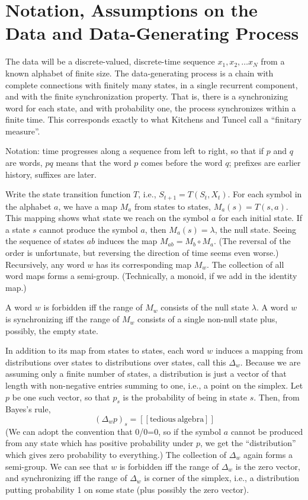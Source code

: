 \documentclass[../new-procedure.tex]{subfiles}
\begin{document}
\section{Notation, Assumptions on the Data and Data-Generating Process}

The data will be a discrete-valued, discrete-time sequence $x_1, x_2, \ldots
x_N$ from a known alphabet of finite size.  The data-generating process is a
chain with complete connections
\cite{Fernandez-Maillard-chains-with-complete-connections,Iosifescu-Grigorescu-complete-connections,Iosifescu-Theodorescu-random-processes}
with finitely many states, in a single recurrent component, and with the finite
synchronization property.  That is, there is a synchronizing word for each
state, and with probability one, the process synchronizes within a finite time.
This corresponds exactly to what Kitchens and Tuncel \cite{Kitchens-Tuncel}
call a ``finitary measure''.

Notation: time progresses along a sequence from left to right, so that if $p$
and $q$ are words, $pq$ means that the word $p$ comes before the word $q$;
prefixes are earlier history, suffixes are later.

Write the state transition function $T$, i.e., $S_{t+1} = T(S_t, X_t)$.  For
each symbol in the alphabet $a$, we have a map $M_a$ from states to states,
$M_a(s) = T(s,a)$.  This mapping shows what state we reach on the symbol $a$
for each initial state.  If a state $s$ cannot produce the symbol $a$, then
$M_a(s) = \lambda$, the null state.  Seeing the sequence of states $ab$ induces
the map $M_{ab} = M_b \circ M_a$.  (The reversal of the order is unfortunate,
but reversing the direction of time seems even worse.)  Recursively, any word
$w$ has its corresponding map $M_w$.  The collection of all word maps forms a
semi-group.  (Technically, a monoid, if we add in the identity map.)

A word $w$ is forbidden iff the range of $M_w$ consists of the null state
$\lambda$.  A word $w$ is synchronizing iff the range of $M_w$ consists of a
single non-null state plus, possibly, the empty state.

In addition to its map from states to states, each word $w$ induces a mapping
from distributions over states to distributions over states, call this
$\Delta_w$. Because we are assuming only a finite number of states, a
distribution is just a vector of that length with non-negative entries summing
to one, i.e., a point on the simplex.  Let $p$ be one such vector, so that
$p_s$ is the probability of being in state $s$.  Then, from Bayes's
rule,
\[
(\Delta_w p)_s = [[\mathrm{tedious\ algebra}]]
\]
(We can adopt the convention that 0/0=0, so if the symbol $a$ cannot be
produced from any state which has positive probability under $p$, we get the
``distribution'' which gives zero probability to everything.)  The collection
of $\Delta_w$ again forms a semi-group.  We can see that $w$ is forbidden iff
the range of $\Delta_w$ is the zero vector, and synchronizing iff the range of
$\Delta_w$ is corner of the simplex, i.e., a distribution putting probability 1
on some state (plus possibly the zero vector).
\end{document}
